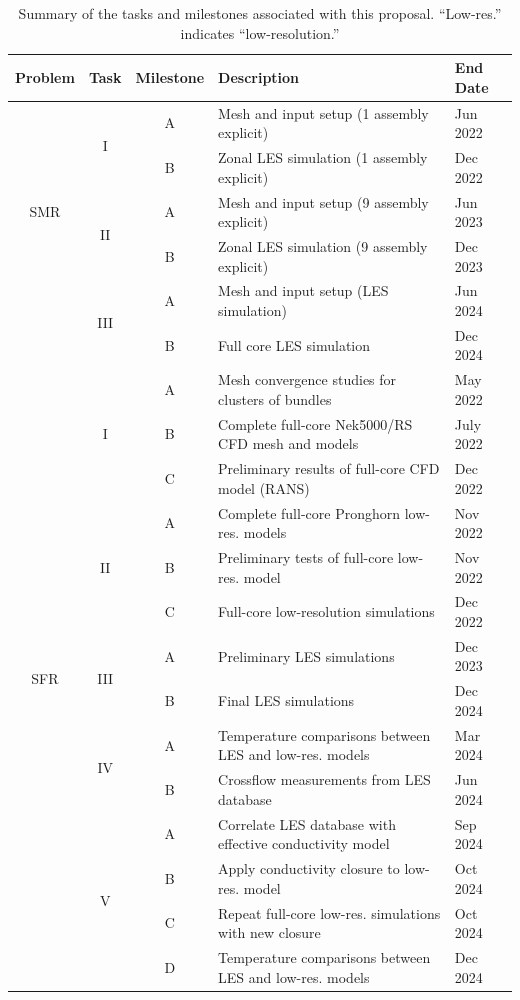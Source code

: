\begin{table}[h!]
\centering
\caption{Summary of the tasks and milestones associated with this proposal. ``Low-res.'' indicates ``low-resolution.''}
\begin{tabular}{c c c l l}
\toprule
Problem & Task & Milestone & Description & End Date \\
\midrule
\multirow{5}{*}{SMR} & \multirow{2}{*}{I} & A & Mesh and input setup (1 assembly explicit) & Jun 2022 \\
&  & B & Zonal LES simulation (1 assembly explicit)  & Dec 2022 \\\cmidrule{2-5}
& \multirow{2}{*}{II} & A & Mesh and input setup (9 assembly explicit)  & Jun 2023 \\
&  & B & Zonal LES simulation (9 assembly explicit)  & Dec 2023 \\\cmidrule{2-5}
& \multirow{2}{*}{III} & A & Mesh and input setup (LES simulation) & Jun 2024 \\
&  & B & Full core LES simulation  & Dec 2024 \\
\midrule
\multirow{14}{*}{SFR} & \multirow{3}{*}{I} & A & Mesh convergence studies for clusters of bundles & May 2022 \\
& & B & Complete full-core Nek5000/RS CFD mesh and models & July 2022\\
& & C & Preliminary results of full-core CFD model (RANS) & Dec 2022\\\cmidrule{2-5}
& \multirow{3}{*}{II} & A & Complete full-core Pronghorn low-res. models & Nov 2022 \\
& & B & Preliminary tests of full-core low-res. model & Nov 2022\\
& & C & Full-core low-resolution simulations & Dec 2022\\\cmidrule{2-5}
& \multirow{2}{*}{III} & A & Preliminary LES simulations  & Dec 2023\\
& & B & Final LES simulations  & Dec 2024\\\cmidrule{2-5}
& \multirow{2}{*}{IV} & A & Temperature comparisons between LES and low-res. models & Mar 2024\\
& & B & Crossflow measurements from LES database & Jun 2024\\\cmidrule{2-5}
& \multirow{4}{*}{V} & A & Correlate LES database with effective conductivity model & Sep 2024\\
& & B & Apply conductivity closure to low-res. model & Oct 2024\\
& & C & Repeat full-core low-res. simulations with new closure & Oct 2024\\
& & D & Temperature comparisons between LES and low-res. models & Dec 2024\\
\bottomrule
\end{tabular}
\label{tab:milestones}
\end{table}

